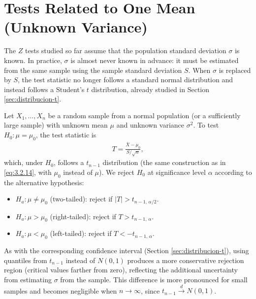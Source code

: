 \section{Tests Related to One Mean (Unknown Variance)}
\label{sec:prueba-t-media}

The $Z$ tests studied so far assume that the population standard deviation $\sigma$ is known. In practice, $\sigma$ is almost never known in advance: it must be estimated from the same sample using the sample standard deviation $S$. When $\sigma$ is replaced by $S$, the test statistic no longer follows a standard normal distribution and instead follows a Student's $t$ distribution, already studied in Section \ref{sec:distribucion-t}.

\begin{teorema}
	Let $X_1, \ldots, X_n$ be a random sample from a normal population (or a sufficiently large sample) with unknown mean $\mu$ and unknown variance $\sigma^2$. To test $H_0: \mu = \mu_0$, the test statistic is
	\begin{align}
		\label{eq:6.4.1}
		T = \frac{\bar{X} - \mu_0}{S/\sqrt{n}},
	\end{align}
	which, under $H_0$, follows a $t_{n-1}$ distribution (the same construction as in \eqref{eq:3.2.14}, with $\mu_0$ instead of $\mu$). We reject $H_0$ at significance level $\alpha$ according to the alternative hypothesis:
	\begin{itemize}
		\item $H_a: \mu \neq \mu_0$ (two-tailed): reject if $|T| > t_{n-1,\,\alpha/2}$.
		\item $H_a: \mu > \mu_0$ (right-tailed): reject if $T > t_{n-1,\,\alpha}$.
		\item $H_a: \mu < \mu_0$ (left-tailed): reject if $T < -t_{n-1,\,\alpha}$.
	\end{itemize}
\end{teorema}

\begin{observacion}
	As with the corresponding confidence interval (Section \ref{sec:distribucion-t}), using quantiles from $t_{n-1}$ instead of $N(0,1)$ produces a more conservative rejection region (critical values farther from zero), reflecting the additional uncertainty from estimating $\sigma$ from the sample. This difference is more pronounced for small samples and becomes negligible when $n \to \infty$, since $t_{n-1} \xrightarrow{d} N(0,1)$.
\end{observacion}

